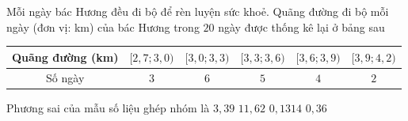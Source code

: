 \begin{ex}%
	Mỗi ngày bác Hương đều đi bộ để rèn luyện sức khoẻ. Quãng đường đi bộ mỗi ngày (đơn vị:  km) của bác Hương trong $20$ ngày được thống kê lại ở bảng sau
	\begin{longtable}{|c|c|c|c|c|c|}
		\hline 
		Quãng đường (km) & $[2{,}7;3{,}0)$ & $[3{,}0;3{,}3)$ & $[3{,}3;3{,}6)$ & $[3{,}6;3{,}9)$  & $[3{,}9;4{,}2)$\\
		 \hline
		Số ngày & $3$ & $6$ & $5$ & $4$  & $2$\\
		 \hline
	\end{longtable}
	Phương sai  của mẫu số liệu ghép nhóm là
	\choice 
		 {$3{,}39$}
		{$11{,}62$} 
		{\True $0{,}1314$} 
		{$0{,}36$} 
\end{ex}

